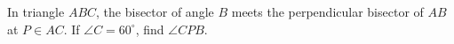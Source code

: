 In triangle $ABC$, the bisector of angle $B$ meets the perpendicular bisector of $AB$ at $P\in AC$. If $\angle C=60^\circ$, find $\angle CPB$.
